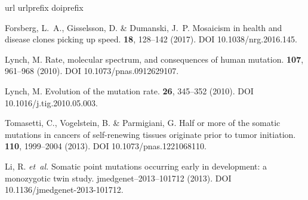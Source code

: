 \documentclass[12pt,inline]{wlscirep}
\begin{document}
\begin{thebibliography}{10}
\expandafter\ifx\csname url\endcsname\relax
  \def\url#1{\texttt{#1}}\fi
\expandafter\ifx\csname urlprefix\endcsname\relax\def\urlprefix{URL }\fi
\expandafter\ifx\csname doiprefix\endcsname\relax\def\doiprefix{DOI }\fi
\providecommand{\bibinfo}[2]{#2}
\providecommand{\eprint}[2][]{\url{#2}}

\bibinfo{author}{Forsberg, L.~A.}, \bibinfo{author}{Gisselsson, D.} \&
  \bibinfo{author}{Dumanski, J.~P.}
\newblock \bibinfo{journal}{\bibinfo{title}{Mosaicism in health and disease
  {\textemdash} clones picking up speed}}.
  \textbf{\bibinfo{volume}{18}}, \bibinfo{pages}{128--142}
  (\bibinfo{year}{2017}).
\newblock \doiprefix 10.1038/nrg.2016.145.

\bibinfo{author}{Lynch, M.}
\newblock \bibinfo{journal}{\bibinfo{title}{Rate, molecular spectrum, and
  consequences of human mutation}}.
 \textbf{\bibinfo{volume}{107}}, \bibinfo{pages}{961--968}
  (\bibinfo{year}{2010}).
\newblock \doiprefix 10.1073/pnas.0912629107.

\bibinfo{author}{Lynch, M.}
\newblock \bibinfo{journal}{\bibinfo{title}{Evolution of the mutation rate}}.
  \textbf{\bibinfo{volume}{26}}, \bibinfo{pages}{345--352}
  (\bibinfo{year}{2010}).
\newblock \doiprefix 10.1016/j.tig.2010.05.003.

\bibinfo{author}{Tomasetti, C.}, \bibinfo{author}{Vogelstein, B.} \&
  \bibinfo{author}{Parmigiani, G.}
\newblock \bibinfo{journal}{\bibinfo{title}{Half or more of the somatic
  mutations in cancers of self-renewing tissues originate prior to tumor
  initiation}}.
 \textbf{\bibinfo{volume}{110}}, \bibinfo{pages}{1999--2004}
  (\bibinfo{year}{2013}).
\newblock \doiprefix 10.1073/pnas.1221068110.

\bibinfo{author}{Li, R.} \emph{et~al.}
\newblock \bibinfo{journal}{\bibinfo{title}{Somatic point mutations occurring
  early in development: a monozygotic twin study}}.
  \bibinfo{pages}{jmedgenet--2013--101712} (\bibinfo{year}{2013}).
\newblock \doiprefix 10.1136/jmedgenet-2013-101712.


\end{thebibliography}
\end{document}
